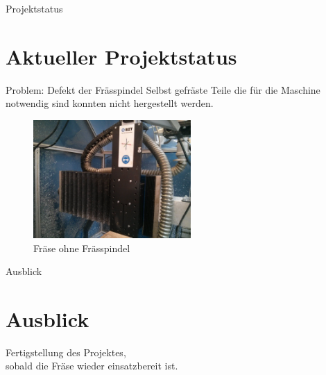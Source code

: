\documentclass[12pt]{beamer}
\begin{document}
\begin{frame}{Projektstatus}
\section{Aktueller Projektstatus}
Problem: Defekt der Frässpindel\newline
Selbst gefräste Teile die für die Maschine notwendig sind konnten nicht hergestellt werden.

\begin{figure}
	\includegraphics[width=6cm]{bilder/fraese_defekt.jpg}
	\caption{Fräse ohne Frässpindel}
\end{figure}

\end{frame}

\begin{frame}{Ausblick}
\section{Ausblick}
\begin{center}
Fertigstellung des Projektes,\\sobald die Fräse wieder einsatzbereit ist.
\end{center} 
\end{frame}
\end{document}
